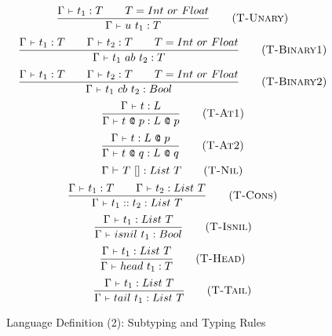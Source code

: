 \documentclass{report}
\makeatletter
\newcommand{\at}{~\texttt{@}~}
\newcommand{\type}{:}
\newcommand{\ctx}{~\mathsmaller\vdash~}
\newcommand{\ctxtype}[2]{\Gamma\ctx #1 \type #2}
\makeatother
\begin{document}
\begin{figure}
\begin{multicols}{2}
    \begin{equation}
        \frac{\ctxtype{t_1}{T}\qquad T = Int~or~Float}{\ctxtype{u~t_1}{T}}
        \tag{\textsc{T-Unary}}
        \label{tunary}
    \end{equation}
    \begin{equation}
        \frac{\ctxtype{t_1}{T}\qquad\ctxtype{t_2}{T}\qquad T = Int~or~Float}{\ctxtype{t_1~ab~t_2}{T}}
        \tag{\textsc{T-Binary1}}
        \label{tbinary1}
    \end{equation}
    \begin{equation}
        \frac{\ctxtype{t_1}{T}\qquad\ctxtype{t_2}{T}\qquad T = Int~or~Float}{\ctxtype{t_1~cb~t_2}{Bool}}
        \tag{\textsc{T-Binary2}}
        \label{tbinary2}
    \end{equation}
    \begin{equation}
        \frac{\ctxtype{t}{L}}{\ctxtype{t\at p}{L\at p}}
        \tag{\textsc{T-At1}}
        \label{tat1}
    \end{equation}
    \begin{equation}
        \frac{\ctxtype{t}{L\at p}}{\ctxtype{t\at q}{L\at q}}
        \tag{\textsc{T-At2}}
        \label{tat2}
    \end{equation}
    \begin{equation}
        \ctxtype{T~[]}{List~T}
        \tag{\textsc{T-Nil}}
        \label{tnil}
    \end{equation}
    \begin{equation}
        \frac{\ctxtype{t_1}{T}\qquad\ctxtype{t_2}{List~T}}{\ctxtype{t_1 :: t_2}{List~T}}
        \tag{\textsc{T-Cons}}
        \label{tcons}
    \end{equation}
    \begin{equation}
        \frac{\ctxtype{t_1}{List~T}}{\ctxtype{isnil~t_1}{Bool}}
        \tag{\textsc{T-Isnil}}
        \label{tisnil}
    \end{equation}
    \begin{equation}
        \frac{\ctxtype{t_1}{List~T}}{\ctxtype{head~t_1}{T}}
        \tag{\textsc{T-Head}}
        \label{thead}
    \end{equation}
    \begin{equation}
        \frac{\ctxtype{t_1}{List~T}}{\ctxtype{tail~t_1}{List~T}}
        \tag{\textsc{T-Tail}}
        \label{ttail}
    \end{equation}
  \end{multicols}
  \caption{Language Definition (2): Subtyping and Typing Rules}
  \label{typing}
\end{figure}
\end{document}
